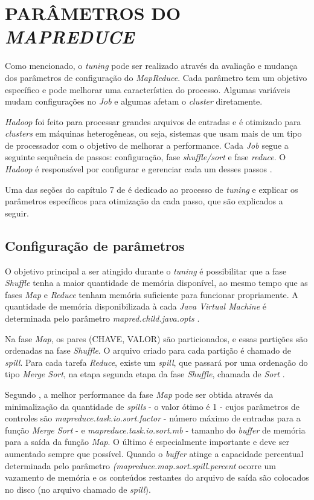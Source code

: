 \section{PARÂMETROS DO \textit{MAPREDUCE}} \label{sec:parametrosmapreduce}

Como mencionado, o \textit{tuning} pode ser realizado através da avaliação e mudança dos parâmetros de configuração do \textit{MapReduce}. Cada parâmetro tem um objetivo específico e pode melhorar uma característica do processo. Algumas variáveis mudam configurações no \textit{Job} e algumas afetam o \textit{cluster} diretamente.

\textit{Hadoop} foi feito para processar grandes arquivos de entradas e é otimizado para \textit{clusters} em máquinas heterogêneas, ou seja, sistemas que usam mais de um tipo de processador com o objetivo de melhorar a performance. Cada \textit{Job} segue a seguinte sequência de passos: configuração, fase \textit{shuffle/sort} e fase \textit{reduce}. O \textit{Hadoop} é responsável por configurar e gerenciar cada um desses passos \cite{ProHadoop09}.

Uma das seções do capítulo 7 de \textcite{HadoopBook15} é dedicado ao processo de \textit{tuning} e explicar os parâmetros específicos para otimização da cada passo, que são explicados a seguir.

\subsection{Configuração de parâmetros}\label{ssec:configuracaooparametros}

O objetivo principal a ser atingido durante o \textit{tuning} é possibilitar que a fase \textit{Shuffle} tenha a maior quantidade de memória disponível, ao mesmo tempo que as fases \textit{Map} e \textit{Reduce} tenham memória suficiente para funcionar propriamente. A quantidade de memória disponibilizada à cada \textit{Java Virtual Machine} é determinada pelo parâmetro \textit{mapred.child.java.opts} \cite{HadoopBook15}.

Na fase \textit{Map}, os pares (CHAVE, VALOR) são particionados, e essas partições são ordenadas na fase \textit{Shuffle}. O arquivo criado para cada partição é chamado de \textit{spill}. Para cada tarefa \textit{Reduce}, existe um \textit{spill}, que passará por uma ordenação do tipo \textit{Merge Sort}, na etapa segunda etapa da fase \textit{Shuffle}, chamada de \textit{Sort} \cite{ProHadoop09}.

Segundo \textcite{HadoopBook15}, a melhor performance da fase \textit{Map} pode ser obtida através da minimalização da quantidade de \textit{spills} - o valor ótimo é 1 - cujos parâmetros de controles são \textit{mapreduce.task.io.sort.factor} - número máximo de entradas para a função \textit{Merge Sort} - e \textit{mapreduce.task.io.sort.mb} - tamanho do \textit{buffer} de memória para a saída da função \textit{Map}. O último é especialmente importante e deve ser aumentado sempre que possível. Quando o \textit{buffer} atinge a capacidade percentual determinada pelo parâmetro \textit{(mapreduce.map.sort.spill.percent} ocorre um vazamento de memória e os conteúdos restantes do arquivo de saída são colocados no disco (no arquivo chamado de \textit{spill}).

